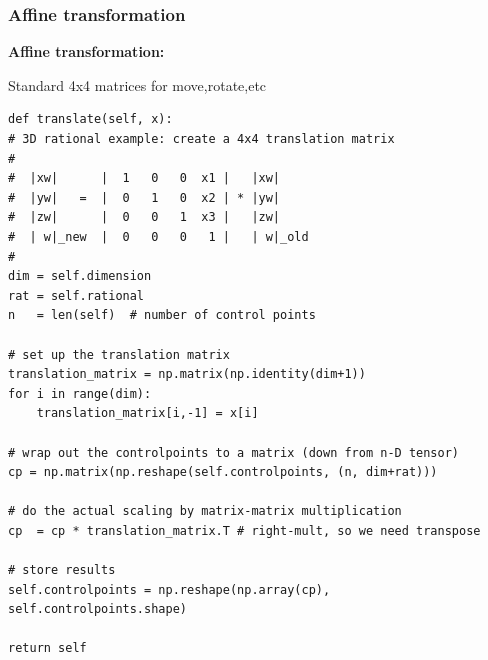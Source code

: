 \documentclass{beamer}
\theoremstyle{plain}
\theoremstyle{definition}
\begin{document}

\begin{frame}[fragile]
\frametitle{Affine transformation}
\textbf{Affine transformation:}

Standard 4x4 matrices for move,rotate,etc

\begin{listing}[H]
    \tiny
    \begin{verbatim}
def translate(self, x):
# 3D rational example: create a 4x4 translation matrix
#
#  |xw|      |  1   0   0  x1 |   |xw|
#  |yw|   =  |  0   1   0  x2 | * |yw|
#  |zw|      |  0   0   1  x3 |   |zw|
#  | w|_new  |  0   0   0   1 |   | w|_old
# 
dim = self.dimension
rat = self.rational
n   = len(self)  # number of control points

# set up the translation matrix
translation_matrix = np.matrix(np.identity(dim+1))
for i in range(dim):
    translation_matrix[i,-1] = x[i]

# wrap out the controlpoints to a matrix (down from n-D tensor)
cp = np.matrix(np.reshape(self.controlpoints, (n, dim+rat)))

# do the actual scaling by matrix-matrix multiplication
cp  = cp * translation_matrix.T # right-mult, so we need transpose

# store results
self.controlpoints = np.reshape(np.array(cp), self.controlpoints.shape)

return self
    \end{verbatim}
\end{listing}

\end{frame}

\end{document}
